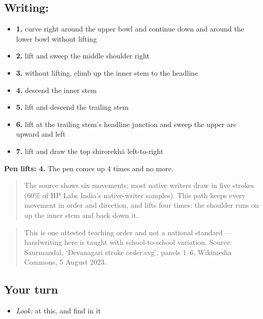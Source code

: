\subsection*{Writing: }

\begin{itemize}
\raggedright
  \item \textbf{1.} curve right around the upper bowl and continue down and around the lower bowl without lifting
  \item \textbf{2.} lift and sweep the middle shoulder right
  \item \textbf{3.} without lifting, climb up the inner stem to the headline
  \item \textbf{4.} descend the inner stem
  \item \textbf{5.} lift and descend the trailing stem
  \item \textbf{6.} lift at the trailing stem's headline junction and sweep the upper arc upward and left
  \item \textbf{7.} lift and draw the top shirorekhā left-to-right
\end{itemize}

\textbf{Pen lifts: 4.} The pen comes up 4 times and no more.

\begin{quote}
The source shows six movements; most native writers draw  in five strokes (60\% of HP Labs India's native-writer samples). This path keeps every movement in order and direction, and lifts four times: the shoulder runs on up the inner stem and back down it.
\end{quote}

\begin{quote}
This is one attested teaching order and not a national standard — handwriting here is taught with school-to-school variation. Source: Saurmandal, ‘Devanagari  stroke order.svg’, panels 1–6, Wikimedia Commons, 5 August 2023.
\end{quote}

\subsection*{Your turn}
\begin{itemize}
\raggedright
  \item \emph{Look:} at this, and find  in it
\end{itemize}

